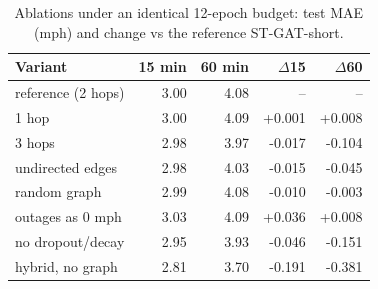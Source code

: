 \begin{table}[t]\centering
\caption{Ablations under an identical 12-epoch budget: test MAE (mph) and change vs the reference ST-GAT-short.}
\label{tab:abl}\footnotesize
\begin{tabular}{lrrrr}\hline
Variant & 15 min & 60 min & $\Delta$15 & $\Delta$60\\\hline
reference (2 hops) & 3.00 & 4.08 & -- & --\\
1 hop & 3.00 & 4.09 & +0.001 & +0.008\\
3 hops & 2.98 & 3.97 & -0.017 & -0.104\\
undirected edges & 2.98 & 4.03 & -0.015 & -0.045\\
random graph & 2.99 & 4.08 & -0.010 & -0.003\\
outages as 0 mph & 3.03 & 4.09 & +0.036 & +0.008\\
no dropout/decay & 2.95 & 3.93 & -0.046 & -0.151\\
hybrid, no graph & 2.81 & 3.70 & -0.191 & -0.381\\
\hline\end{tabular}\end{table}

